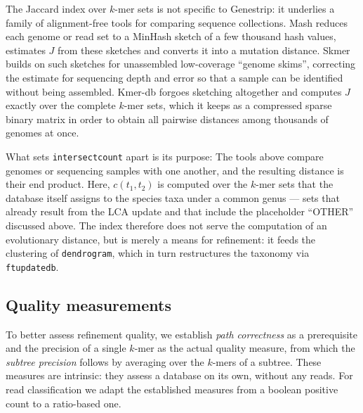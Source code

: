 \documentclass[pdflatex,sn-vancouver-num]{sn-jnl}
\newif\ifshowtodos \showtodostrue
\newcommand{\todo}[1]{%
  \ifshowtodos
    \par\addvspace{0.7\baselineskip}%
    \begin{list}{}{%
      \setlength{\leftmargin}{1.5em}%
      \setlength{\rightmargin}{1.5em}%
      \setlength{\topsep}{0pt}%
      \setlength{\partopsep}{0pt}%
      \setlength{\parsep}{0.5\baselineskip}%
      \setlength{\itemsep}{0pt}%
    }%
    \item[]\footnotesize\color{black!70}%
      \textcolor{orange!65!black}{\rule[-0.2ex]{2pt}{1.15ex}}\hspace{0.55em}%
      \textcolor{orange!65!black}{\textsc{todo}}\hspace{0.6em}\ignorespaces#1%
    \end{list}%
    \addvspace{0.7\baselineskip}%
  \fi%
}
\begin{document}
The Jaccard index over $k$-mer sets is not specific to Genestrip: it underlies a family of alignment-free tools for comparing sequence collections. Mash \cite{Ondov:2016aa} reduces each genome or read set to a MinHash sketch of a few thousand hash values, estimates $J$ from these sketches and converts it into a mutation distance. Skmer \cite{skmer} builds on such sketches for unassembled low-coverage \enquote{genome skims}, correcting the estimate for sequencing depth and error so that a sample can be identified without being assembled. Kmer-db \cite{kmerdb} forgoes sketching altogether and computes $J$ exactly over the complete $k$-mer sets, which it keeps as a compressed sparse binary matrix in order to obtain all pairwise distances among thousands of genomes at once.

What sets \verb|intersectcount| apart is its purpose: The tools above compare genomes or sequencing samples with one another, and the resulting distance is their end product. Here, $c(t_1, t_2)$ is computed over the $k$-mer sets that the database itself assigns to the species taxa under a common genus --- sets that already result from the LCA update and that include the placeholder \enquote{OTHER} discussed above. The index therefore does not serve the computation of an evolutionary distance, but is merely a means for refinement: it feeds the clustering of \verb|dendrogram|, which in turn restructures the taxonomy via \verb|ftupdatedb|.
%
%

\subsection{Quality measurements}

\label{intrinsicqms}
    To better assess refinement quality, we establish \emph{path correctness} as a prerequisite and the precision of a single $k$-mer as the actual quality measure, from which the \emph{subtree precision} follows by averaging over the $k$-mers of a subtree.
    These measures are intrinsic: they assess a database on its own, without any reads.
    For read classification we adapt the established measures from a boolean positive count to a ratio-based one.
\end{document}
